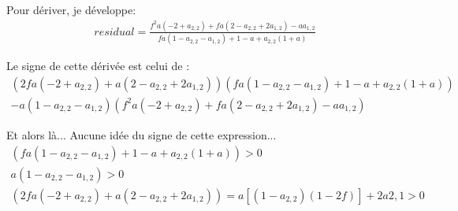 \documentclass[11pt,a4paper]{article}
\begin{document}
Pour dériver, je développe: 
\begin{gather*}
residual=\frac{f^2a\left(-2+a_{2,2}\right)+fa\left(2-a_{2,2}+2a_{1,2}\right)-aa_{1,2}}{fa\left(1-a_{2,2}-a_{1,2}\right)+1-a+a_{2,2}(1+a)}
\end{gather*}

Le signe de cette dérivée est celui de : 
\begin{gather*}
\left(
	2fa\left(
		-2+a_{2,2}\right)
	+a\left(
		2-a_{2,2}+2a_{1,2}\right)
	\right)
\left(
	fa\left(
		1-a_{2,2}-a_{1,2}\right)
+1-a+a_{2,2}(1+a)\right) \\
-a\left(
	1-a_{2,2}-a_{1,2}\right)
\left(
	f^2a\left(
		-2+a_{2,2}\right)
	+fa\left(
		2-a_{2,2}+2a_{1,2}\right)
	-aa_{1,2}\right)
\end{gather*}

Et alors là... Aucune idée du signe de cette expression...
\begin{gather*}
\left(
	fa\left(
		1-a_{2,2}-a_{1,2}\right)
+1-a+a_{2,2}(1+a)\right) > 0
\\
a\left(
	1-a_{2,2}-a_{1,2}\right) >0
\\
\left(
	2fa\left(
		-2+a_{2,2}\right)
	+a\left(
		2-a_{2,2}+2a_{1,2}\right)
	\right) = a\left[\left(1-a_{2,2}\right)\left(1-2f\right)\right]+2a{2,1}	>0
\end{gather*}
\end{document}
